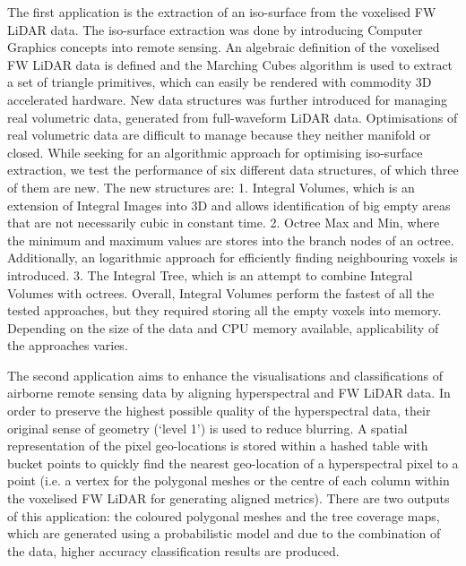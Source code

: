 \documentclass{subfiles}
\begin{document}
\par The first application is the extraction of an iso-surface from the voxelised FW LiDAR data. The iso-surface extraction was done by introducing Computer Graphics concepts into remote sensing. An algebraic definition of the voxelised FW LiDAR data is defined and the Marching Cubes algorithm is used to extract a set of triangle primitives, which can easily be rendered with commodity 3D accelerated hardware. New data structures was further introduced for managing real volumetric data, generated from full-waveform LiDAR data. Optimisations of real volumetric data are difficult to manage because they neither manifold or closed. While seeking for an algorithmic approach for optimising iso-surface extraction, we test the performance of six different data structures, of which three of them are new. The new structures are: 1. Integral Volumes, which is an extension of Integral Images into 3D and allows identification of big empty areas that are not necessarily cubic in constant time. 2. Octree Max and Min, where the minimum and maximum values are stores into the branch nodes of an octree. Additionally, an logarithmic approach for efficiently finding neighbouring voxels is introduced. 3. The Integral Tree, which is an attempt to combine Integral Volumes with octrees. Overall, Integral Volumes perform the fastest of all the tested approaches, but they required storing all the empty voxels into memory. Depending on the size of the data and CPU memory available, applicability of the approaches varies. 

\par The second application aims to enhance the visualisations and classifications of airborne remote sensing data by aligning hyperspectral and FW LiDAR data.  In order to preserve the highest possible quality of the hyperspectral data, their original sense of geometry (`level 1') is used to reduce blurring. A spatial representation of the pixel geo-locations is stored within a hashed table with bucket points to quickly find the nearest geo-location of a hyperspectral pixel to a point (i.e. a vertex for the polygonal meshes or the centre of each column within the voxelised FW LiDAR for generating aligned metrics). There are two outputs of this application: the coloured polygonal meshes and the tree coverage maps, which are generated using a probabilistic model and due to the combination of the data, higher accuracy classification results are produced. 
\end{document}
